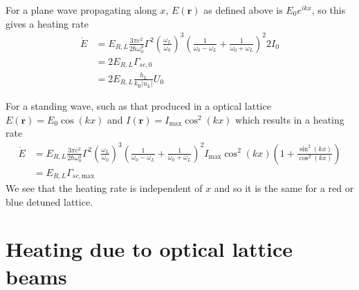 \documentclass[11pt,letter]{article}
\newcommand{\bv}[1]{\ensuremath{\bm{#1}}}
\begin{document}
For a plane wave propagating along $x$, $E(\bv{r})$ as defined above is
$E_{0}e^{ikx}$, so this gives a heating rate 
\begin{equation}
\begin{split}
\dot{E} &  =  
  E_{R,L}
   \frac{3\pi c^{2}}{2\hbar\omega_{0}^{3} }  
   \Gamma^{2}
  \left( \frac{ \omega_{L} }{ \omega_{0} } \right)^{3}
   \left(  \frac{1}{\omega_{0}-\omega_{L}} 
    + \frac{1}{\omega_{0} + \omega_{L} } \right)^{2}
   2  I_{0}  \\
  & = 
   2 E_{R,L}  \Gamma_{sc,0}  \\ 
  & = 
   2 E_{R,L} \frac{ h_{L} }{k_{\text{B}}|u_{L}|} U_{0} 
\end{split} 
\label{eq:heat-dipole}
\end{equation}

For a standing wave, such as that produced in a optical lattice $E(\bv{r}) =
E_{0} \cos(kx) $ and $I(\bv{r})=I_{\text{max}}\cos^{2}(kx)$ which results in
a heating rate 
\begin{equation}
\begin{split}
\dot{E} &  =  
  E_{R,L}
   \frac{3\pi c^{2}}{2\hbar\omega_{0}^{3} }  
   \Gamma^{2}
  \left( \frac{ \omega_{L} }{ \omega_{0} } \right)^{3}
   \left(  \frac{1}{\omega_{0}-\omega_{L}} 
    + \frac{1}{\omega_{0} + \omega_{L} } \right)^{2}
     I_{\max} \cos^{2}(kx) 
   \left( 1 + \frac{\sin^{2}(kx)}{\cos^{2}(kx)} \right) \\
  & = 
   E_{R,L}  \Gamma_{sc,\text{max}}
\end{split}
\end{equation}
We see that the heating rate is independent of $x$ and so it is the same for
a red or blue detuned lattice. 
  
 
 

\section{Heating due to optical lattice beams} 
\end{document}
